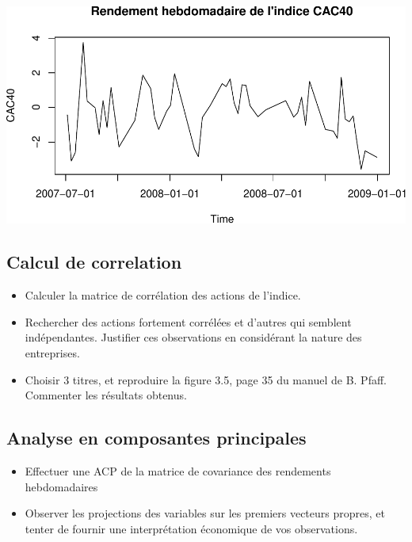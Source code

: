\documentclass[
]{article}
\providecommand{\tightlist}{%
  \setlength{\itemsep}{0pt}\setlength{\parskip}{0pt}}
\begin{document}
\includegraphics{TP1_files/figure-latex/plot-cac-2-1.pdf}

\hypertarget{calcul-de-correlation}{%
\subsection{Calcul de correlation}\label{calcul-de-correlation}}

\begin{itemize}
\item
  Calculer la matrice de corrélation des actions de l'indice.
\item
  Rechercher des actions fortement corrélées et d'autres qui semblent
  indépendantes. Justifier ces observations en considérant la nature des
  entreprises.
\item
  Choisir 3 titres, et reproduire la figure 3.5, page 35 du manuel de B.
  Pfaff. Commenter les résultats obtenus.
\end{itemize}

\hypertarget{analyse-en-composantes-principales}{%
\subsection{Analyse en composantes
principales}\label{analyse-en-composantes-principales}}

\begin{itemize}
\tightlist
\item
  Effectuer une ACP de la matrice de covariance des rendements
  hebdomadaires
\item
  Observer les projections des variables sur les premiers vecteurs
  propres, et tenter de fournir une interprétation économique de vos
  observations.
\end{itemize}
\end{document}
